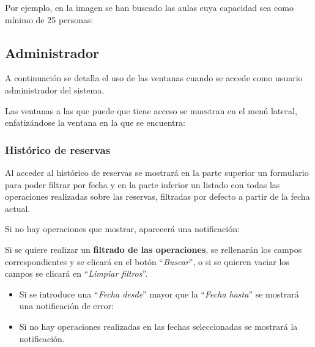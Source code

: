 Por ejemplo, en la imagen se han buscado las aulas cuya capacidad sea como mínimo de 25 personas:


\subsection{Administrador}
A continuación se detalla el uso de las ventanas cuando se accede como usuario administrador del sistema.

Las ventanas a las que puede que tiene acceso se muestran en el menú lateral, enfatizándose la ventana en la que se encuentra:


\subsubsection{Histórico de reservas}
Al acceder al histórico de reservas se mostrará en la parte superior un formulario para poder filtrar por fecha y en la parte inferior un listado con todas las operaciones realizadas sobre las reservas, filtradas por defecto a partir de la fecha actual.

Si no hay operaciones que mostrar, aparecerá una notificación:



Si se quiere realizar un \textbf{filtrado de las operaciones}, se rellenarán los campos correspondientes y se clicará en el botón ``\textit{Buscar}'', o si se quieren vaciar los campos se clicará en ``\textit{Limpiar filtros}''.

\begin{itemize}
    \item Si se introduce una ``\textit{Fecha desde}'' mayor que la ``\textit{Fecha hasta}'' se mostrará una notificación de error:
    
    
    \item Si no hay operaciones realizadas en las fechas seleccionadas se mostrará la notificación.
\end{itemize}

